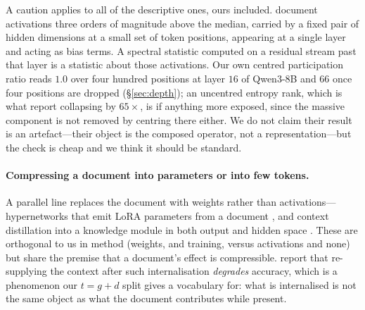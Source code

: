 \documentclass{article}
\newcommand{\dvec}{\ensuremath{d}}
\newcommand{\gvec}{\ensuremath{g}}
\newcommand{\tvec}{\ensuremath{t}}
\begin{document}
A caution applies to all of the descriptive ones, ours included.
\citet{sun2024massive} document activations three orders of magnitude above the
median, carried by a fixed pair of hidden dimensions at a small set of token
positions, appearing at a single layer \citep{shi2026melayer} and acting as
bias terms. A spectral statistic computed on a residual stream past that layer
is a statistic about those activations. Our own centred participation ratio
reads $1.0$ over four hundred positions at layer $16$ of Qwen3-8B and $66$ once
four positions are dropped (\S\ref{sec:depth}); an uncentred entropy rank, which
is what \citet{fernando2026residualspectral} report collapsing by $65\times$, is
if anything more exposed, since the massive component is not removed by
centring there either. We do not claim their result is an artefact---their
object is the composed operator, not a representation---but the check is cheap
and we think it should be standard.

\paragraph{Compressing a document into parameters or into few tokens.} A
parallel line replaces the document with weights rather than activations---
hypernetworks that emit LoRA parameters from a document
\citep{doc2lora2026}, and context distillation into a knowledge module in both
output and hidden space \citep{deepcontextdistill2025}. These are orthogonal to
us in method (weights, and training, versus activations and none) but share the
premise that a document's effect is compressible.
\citet{contextreturns2026} report that re-supplying the context after such
internalisation \emph{degrades} accuracy, which is a phenomenon our
$\tvec=\gvec+\dvec$ split gives a vocabulary for: what is internalised is not
the same object as what the document contributes while present.
\end{document}
